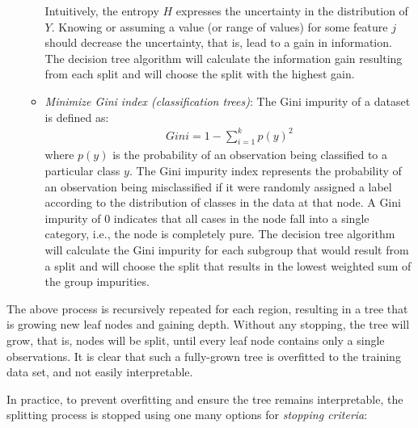 \begin{enumerate}
\begin{itemize}
       Intuitively, the entropy $H$ expresses the uncertainty in the distribution of $Y$. Knowing or assuming a value (or range of values) for some feature $j$ should decrease the uncertainty, that is, lead to a gain in information. The decision tree algorithm will calculate the information gain resulting from each split and will choose the split with the highest gain.
   \item \emph{Minimize Gini index (classification trees)}:
   The Gini impurity of a dataset is defined as:
\begin{align*}
Gini = 1 - \sum_{i=1}^k p(y)^2
\end{align*}
where $p(y)$ is the probability of an observation being classified to a particular class $y$. The Gini impurity index represents the probability of an observation being misclassified if it were randomly assigned a label according to the distribution of classes in the data at that node. A Gini impurity of 0 indicates that all cases in the node fall into a single category, i.e., the node is completely pure. The decision tree algorithm will calculate the Gini impurity for each subgroup that would result from a split and will choose the split that results in the lowest weighted sum of the group impurities.
\end{itemize}
\end{enumerate}

The above process is recursively repeated for each region, resulting in a tree that is growing new leaf nodes and gaining depth. Without any stopping, the tree will grow, that is, nodes will be split, until every leaf node contains only a single observations. It is clear that such a fully-grown tree is overfitted to the training data set, and not easily interpretable. 

In practice, to prevent overfitting and ensure the tree remains interpretable, the splitting process is stopped using one many options for \emph{stopping criteria}:

